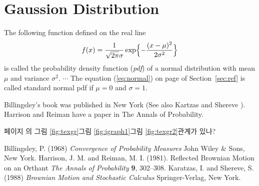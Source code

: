 \documentclass[11pt]{article}
\begin{document}
\tableofcontents

\section{Gaussion Distribution \label{sec:ref}} 
The following function defined on the real line
\begin{equation} \label{eq:normal}
f(x) = \frac{1}{\sqrt{2\pi}\sigma} \exp\Bigl\{-\frac{(x-\mu)^2}{2\sigma^2}\Bigr\}
\end{equation}
is called the probability density function (\emph{pdf}) of a normal distribution with mean $\mu$ and variance $\sigma^2$. $\cdots$ The equation (\eqref{eq:normal}) on page \pageref{eq:normal} of Section~\ref{sec:ref} is called standard normal pdf if $\mu=0$ and $\sigma=1$.

Billingsley's \cite[see Chapter~5]{bill1} book was published in New York (See also Kartzas and Shereve \cite[Optional]{KandS}). Harrison and Reiman \cite{HandR} have a paper in The Annals of Probability.

페이지 \pageref{fig:texgr}\와 \pageref{fig:igraph1}의 그림 \ref{fig:texgr}\과 그림 \ref{fig:igraph1}\는 그림 \ref{fig:texgr2}\와 관계가 있나?

\begin{thebibliography}{12345}
 Billingsley, P. (1968) \emph{Convergence of Probability Measures} John Wiley \& Sons, New York.
 Harrison, J. M. and Reiman, M. I. (1981). Reflected Brownian Motion on an Orthant \emph{The Annals of Probability} \textbf{9}, 302--308.
 Karatzas, I. and Shereve, S. (1988) \emph{Brownian Motion and Stochastic Calculus} Springer-Verlag, New York.
\end{thebibliography}
\end{document}
